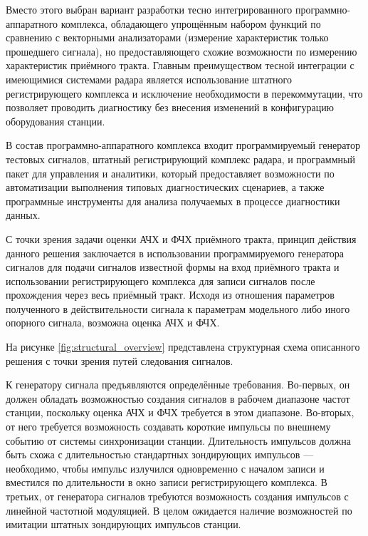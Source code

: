\documentclass{report}
\begin{document}
Вместо этого выбран вариант разработки тесно интегрированного программно-аппаратного комплекса, обладающего упрощённым набором функций по сравнению с векторными анализаторами (измерение характеристик только прошедшего сигнала), но предоставляющего схожие возможности по измерению характеристик приёмного тракта. Главным преимуществом тесной интеграции с имеющимися системами радара является использование штатного регистрирующего комплекса и исключение необходимости в перекоммутации, что позволяет проводить диагностику без внесения изменений в конфигурацию оборудования станции.

В состав программно-аппаратного комплекса входит программируемый генератор тестовых сигналов, штатный регистрирующий комплекс радара, и программный пакет для управления и аналитики, который предоставляет возможности по автоматизации выполнения типовых диагностических сценариев, а также программные инструменты для анализа получаемых в процессе диагностики данных.

С точки зрения задачи оценки АЧХ и ФЧХ приёмного тракта, принцип действия данного решения заключается в использовании программируемого генератора сигналов для подачи сигналов известной формы на вход приёмного тракта и использовании регистрирующего комплекса для записи сигналов после прохождения через весь приёмный тракт. Исходя из отношения параметров полученного в действительности сигнала к параметрам модельного либо иного опорного сигнала, возможна оценка АЧХ и ФЧХ.

\pagebreak

На рисунке \ref{fig:structural_overview} представлена структурная схема описанного решения с точки зрения путей следования сигналов.


К генератору сигнала предъявляются определённые требования. Во-первых, он должен обладать возможностью создания сигналов в рабочем диапазоне частот станции, поскольку оценка АЧХ и ФЧХ требуется в этом диапазоне. Во-вторых, от него требуется возможность создавать короткие импульсы по внешнему событию от системы синхронизации станции. Длительность импульсов должна быть схожа с длительностью стандартных зондирующих импульсов --- необходимо, чтобы импульс излучился одновременно с началом записи и вместился по длительности в окно записи регистрирующего комплекса. В третьих, от генератора сигналов требуются возможность создания импульсов с линейной частотной модуляцией. В целом ожидается наличие возможностей по имитации штатных зондирующих импульсов станции.
\end{document}
